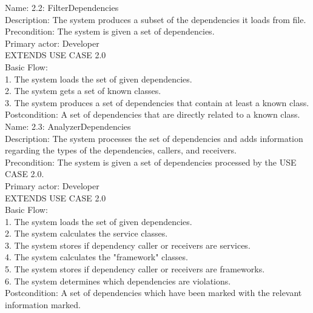 \noindent Name: 2.2: FilterDependencies\\
Description: The system produces a subset of the dependencies it loads from file.\\
Precondition: The system is given a set of dependencies.\\
Primary actor: Developer\\
EXTENDS USE CASE 2.0\\
Basic Flow:\\
1. The system loads the set of given dependencies.\\
2. The system gets a set of known classes.\\
3. The system produces a set of dependencies that contain at least a known class.\\
Postcondition: A set of dependencies that are directly related to a known class. \\

\noindent Name: 2.3: AnalyzerDependencies\\
Description: The system processes the set of dependencies and adds information regarding the types of the dependencies, callers, and receivers.\\
Precondition: The system is given a set of dependencies processed by the USE CASE 2.0.\\
Primary actor: Developer\\
EXTENDS USE CASE 2.0\\
Basic Flow:\\
1. The system loads the set of given dependencies.\\
2. The system calculates the service classes.\\
3. The system stores if dependency caller or receivers are services.\\
4. The system calculates the "framework" classes.\\
5. The system stores if dependency caller or receivers are frameworks.\\
6. The system determines which dependencies are violations.\\
Postcondition: A set of dependencies which have been marked with the relevant information marked.\\

